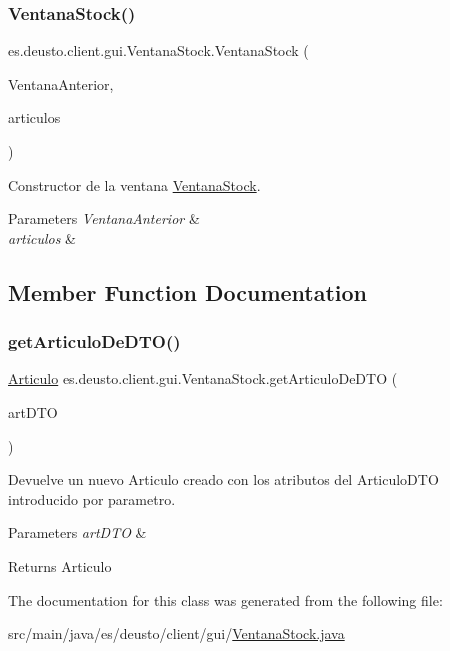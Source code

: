 \subsubsection{\texorpdfstring{VentanaStock()}{VentanaStock()}}
{\footnotesize\ttfamily es.\+deusto.\+client.\+gui.\+Ventana\+Stock.\+Ventana\+Stock (\begin{DoxyParamCaption}\item[{final J\+Frame}]{Ventana\+Anterior,  }\item[{List$<$ \mbox{\hyperlink{classes_1_1deusto_1_1server_1_1dto_1_1_articulo_d_t_o}{Articulo\+D\+TO}} $>$}]{articulos }\end{DoxyParamCaption})}

Constructor de la ventana \mbox{\hyperlink{classes_1_1deusto_1_1client_1_1gui_1_1_ventana_stock}{Ventana\+Stock}}. 
\begin{DoxyParams}{Parameters}
{\em Ventana\+Anterior} & \\
\hline
{\em articulos} & \\
\hline
\end{DoxyParams}


\subsection{Member Function Documentation}
\mbox{\label{classes_1_1deusto_1_1client_1_1gui_1_1_ventana_stock_aa2b5f90e0304767e85bc53b4b6b9fac5}} 
\subsubsection{\texorpdfstring{getArticuloDeDTO()}{getArticuloDeDTO()}}
{\footnotesize\ttfamily \mbox{\hyperlink{classes_1_1deusto_1_1client_1_1data_1_1_articulo}{Articulo}} es.\+deusto.\+client.\+gui.\+Ventana\+Stock.\+get\+Articulo\+De\+D\+TO (\begin{DoxyParamCaption}\item[{\mbox{\hyperlink{classes_1_1deusto_1_1server_1_1dto_1_1_articulo_d_t_o}{Articulo\+D\+TO}}}]{art\+D\+TO }\end{DoxyParamCaption})}

Devuelve un nuevo Articulo creado con los atributos del Articulo\+D\+TO introducido por parametro. 
\begin{DoxyParams}{Parameters}
{\em art\+D\+TO} & \\
\hline
\end{DoxyParams}
\begin{DoxyReturn}{Returns}
Articulo 
\end{DoxyReturn}


The documentation for this class was generated from the following file\+:\begin{DoxyCompactItemize}
\item 
src/main/java/es/deusto/client/gui/\mbox{\hyperlink{_ventana_stock_8java}{Ventana\+Stock.\+java}}\end{DoxyCompactItemize}
